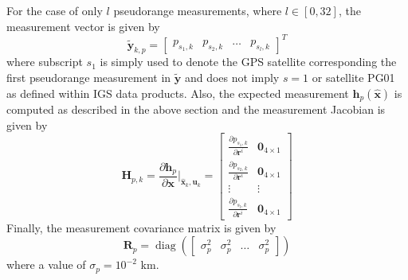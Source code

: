 \documentclass[letterpaper, paper,11pt]{AAS}		%
\begin{document}
For the case of only $l$ pseudorange measurements, where $l\in[0, 32]$, the measurement vector is given by
\begin{equation}
	\tilde{\mathbf{y}}_{k,p} = \begin{bmatrix}
		p_{s_1,k} & p_{s_2,k} & \dots & p_{s_l,k}
	\end{bmatrix}^T
\end{equation} 
where subscript $s_1$ is simply used to denote the GPS satellite corresponding the first pseudorange measurement in $\tilde{\mathbf{y}}$ and does not imply $s=1$ or satellite PG01 as defined within IGS data products. Also, the expected measurement $\mathbf{h}_p(\hat{\mathbf{x}})$ is computed as described in the above section and the measurement Jacobian is given by
\begin{equation}
	\mathbf{H}_{p,k} = \frac{\partial \mathbf{h}_p}{\partial \mathbf{x}} \bigg|_{\hat{\mathbf{x}}_k,\mathbf{u}_k}  = \begin{bmatrix}
		\frac{\partial p_{s_1,k}}{\partial \mathbf{r}^i} & \mathbf{0}_{4\times 1} \\
		\frac{\partial p_{s_2,k}}{\partial \mathbf{r}^i} & \mathbf{0}_{4\times 1} \\
		\vdots & \vdots \\
		\frac{\partial p_{s_l,k}}{\partial \mathbf{r}^i} & \mathbf{0}_{4\times 1} 
	\end{bmatrix}
\end{equation}
Finally, the measurement covariance matrix is given by
\begin{equation}
	\mathbf{R}_p = \operatorname{diag}(\begin{bmatrix}
		\sigma_p^2 & \sigma_p^2 & \dots & \sigma_p^2
	\end{bmatrix})
\end{equation}
where a value of $\sigma_p = 10^{-2}$ km.
\end{document}
